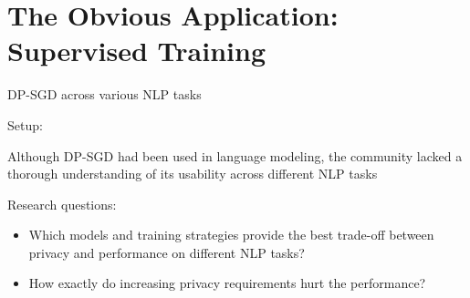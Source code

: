 \documentclass[12pt,aspectratio=169,handout]{beamer}
\begin{document}
\section{The Obvious Application: Supervised Training}

\begin{frame}{DP-SGD across various NLP tasks}

Setup:

Although DP-SGD had been used in language modeling, the community lacked a thorough understanding of its usability across different NLP tasks

Research questions:

\begin{itemize}
\item Which models and training strategies provide the best trade-off between privacy and performance on different NLP tasks?
\item How exactly do increasing privacy requirements hurt the performance?
\end{itemize}



\end{frame}
\end{document}
